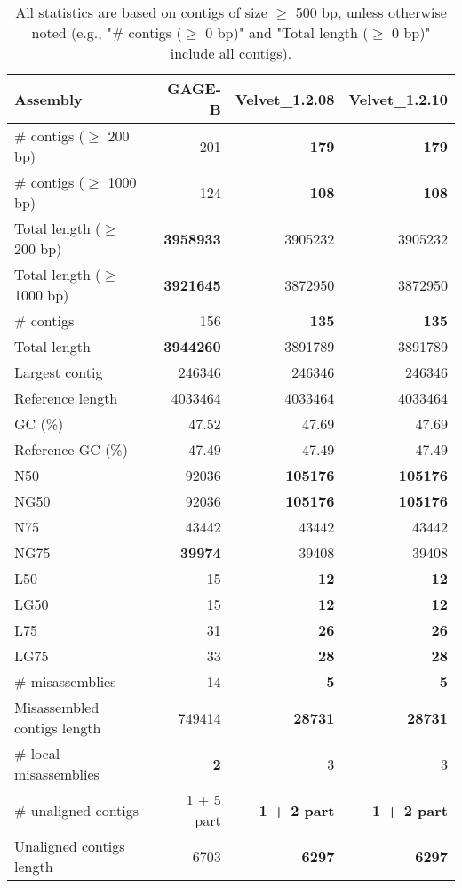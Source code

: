 \documentclass[12pt,a4paper]{article}
\begin{document}
\begin{table}[ht]
\begin{center}
\caption{All statistics are based on contigs of size $\geq$ 500 bp, unless otherwise noted (e.g., "\# contigs ($\geq$ 0 bp)" and "Total length ($\geq$ 0 bp)" include all contigs).}
\begin{tabular}{|l*{3}{|r}|}
\hline
Assembly & GAGE-B & Velvet\_1.2.08 & Velvet\_1.2.10 \\ \hline
\# contigs ($\geq$ 200 bp) & 201 & {\bf 179} & {\bf 179} \\ \hline
\# contigs ($\geq$ 1000 bp) & 124 & {\bf 108} & {\bf 108} \\ \hline
Total length ($\geq$ 200 bp) & {\bf 3958933} & 3905232 & 3905232 \\ \hline
Total length ($\geq$ 1000 bp) & {\bf 3921645} & 3872950 & 3872950 \\ \hline
\# contigs & 156 & {\bf 135} & {\bf 135} \\ \hline
Total length & {\bf 3944260} & 3891789 & 3891789 \\ \hline
Largest contig & 246346 & 246346 & 246346 \\ \hline
Reference length & 4033464 & 4033464 & 4033464 \\ \hline
GC (\%) & 47.52 & 47.69 & 47.69 \\ \hline
Reference GC (\%) & 47.49 & 47.49 & 47.49 \\ \hline
N50 & 92036 & {\bf 105176} & {\bf 105176} \\ \hline
NG50 & 92036 & {\bf 105176} & {\bf 105176} \\ \hline
N75 & 43442 & 43442 & 43442 \\ \hline
NG75 & {\bf 39974} & 39408 & 39408 \\ \hline
L50 & 15 & {\bf 12} & {\bf 12} \\ \hline
LG50 & 15 & {\bf 12} & {\bf 12} \\ \hline
L75 & 31 & {\bf 26} & {\bf 26} \\ \hline
LG75 & 33 & {\bf 28} & {\bf 28} \\ \hline
\# misassemblies & 14 & {\bf 5} & {\bf 5} \\ \hline
Misassembled contigs length & 749414 & {\bf 28731} & {\bf 28731} \\ \hline
\# local misassemblies & {\bf 2} & 3 & 3 \\ \hline
\# unaligned contigs & 1 + 5 part & {\bf 1 + 2 part} & {\bf 1 + 2 part} \\ \hline
Unaligned contigs length & 6703 & {\bf 6297} & {\bf 6297} \\ \hline

\end{tabular}
\end{center}
\end{table}
\end{document}
